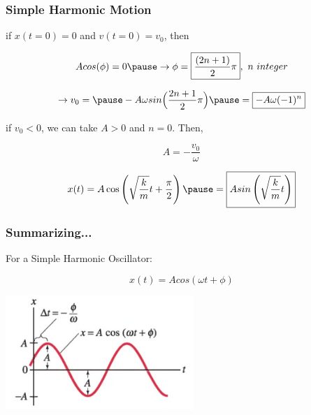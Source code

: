 \documentclass[]{beamer}
\begin{document}



\begin{frame}
\frametitle{Simple Harmonic Motion}

if  $x(t=0)=0$ and $v(t=0)=v_0$, then

\pause

\begin{equation*}
Acos(\phi)=0\pause\rightarrow \phi=\boxed{\frac{(2n+1)}{2}\pi},~n~integer
\end{equation*}

\pause

\begin{equation*}
\rightarrow v_0=\pause-A \omega sin\Big(\frac{2n+1}{2}\pi\Big) \pause=\boxed{-A \omega (-1)^n}
\end{equation*}

\vspace{3mm}

\pause

if $v_0<0$,  we can take $A>0$ and  $n=0$. Then,

\pause

\begin{equation*}
A=-\frac{v_0}{\omega}
\end{equation*}

\pause

\begin{equation*}
x(t)=A\cos\left(\sqrt{\frac{k}{m}}t+\frac{\pi}{2}\right)\pause =\boxed{Asin\left(\sqrt{\frac{k}{m}}t\right)} 
\end{equation*}





  \end{frame}








\begin{frame}
\frametitle{Summarizing...}


For a Simple Harmonic Oscillator:

\begin{equation*}
x(t)=Acos(\omega t+\phi)
\end{equation*}

  \begin{center}
  \includegraphics[height=1.7in]{images3/solution.jpg}
\end{center}


  \end{frame}
\end{document}
